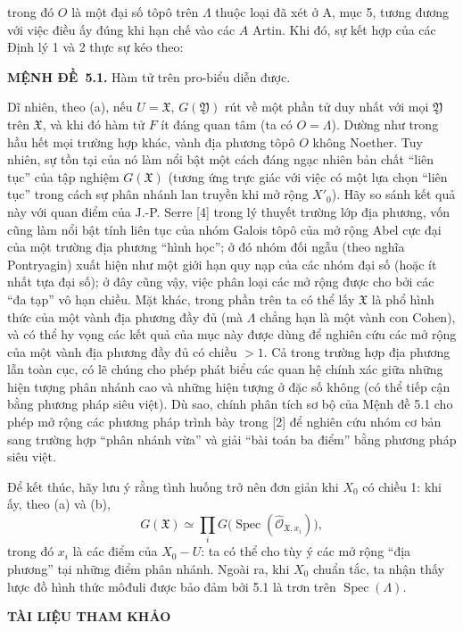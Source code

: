 \documentclass[11pt,twoside,openany]{book}
\numberwithin{equation}{section}
\newcommand{\src}[1]{%
  \phantomsection\hypertarget{src:\fgasourceid:#1}{}%
  \marginpar{\raggedleft\footnotesize\sffamily #1}%
}
\newcommand{\fgasourceid}{unset}
\newcommand{\result}[2]{\par\medskip\noindent\textbf{#1\if\relax\detokenize{#2}\relax\else\ #2\fi.}\quad}
\begin{document}
\src{389}
trong đó $O$ là một đại số tôpô trên $\Lambda$ thuộc loại đã xét ở A, mục 5,
tương đương với việc điều ấy đúng khi hạn chế vào các $A$ Artin. Khi đó, sự kết
hợp của các Định lý 1 và 2 thực sự kéo theo:

\result{MỆNH ĐỀ}{5.1} Hàm tử trên pro-biểu diễn được.

Dĩ nhiên, theo (a), nếu $U=\mathfrak X$, $G(\mathfrak Y)$ rút về một phần tử
duy nhất với mọi $\mathfrak Y$ trên $\mathfrak X$, và khi đó hàm tử $F$ ít
đáng quan tâm (ta có $O=\Lambda$). Dường như trong hầu hết mọi trường hợp khác,
vành địa phương tôpô $O$ không Noether. Tuy nhiên, sự tồn tại của nó làm nổi
bật một cách đáng ngạc nhiên bản chất ``liên tục'' của tập nghiệm
$G(\mathfrak X)$ (tương ứng trực giác với việc có một lựa chọn ``liên tục''
trong cách sự phân nhánh lan truyền khi mở rộng $X'_0$). Hãy so sánh kết quả
này với quan điểm của J.-P. Serre [4] trong lý thuyết trường lớp địa phương,
vốn cũng làm nổi bật tính liên tục của nhóm Galois tôpô của mở rộng Abel cực
đại của một trường địa phương ``hình học''; ở đó nhóm đối ngẫu (theo nghĩa
Pontryagin) xuất hiện như một giới hạn quy nạp của các nhóm đại số (hoặc ít
nhất tựa đại số); ở đây cũng vậy, việc phân loại các mở rộng được cho bởi các
``đa tạp'' vô hạn chiều. Mặt khác, trong phần trên ta có thể lấy
$\mathfrak X$ là phổ hình thức của một vành địa phương đầy đủ (mà $\Lambda$
chẳng hạn là một vành con Cohen), và có thể hy vọng các kết quả của mục này
được dùng để nghiên cứu các mở rộng của một vành địa phương đầy đủ có chiều
$>1$. Cả trong trường hợp địa phương lẫn toàn cục, có lẽ chúng cho phép phát
biểu các quan hệ chính xác giữa những hiện tượng phân nhánh cao và những hiện
tượng ở đặc số không (có thể tiếp cận bằng phương pháp siêu việt). Dù sao,
chính phân tích sơ bộ của Mệnh đề 5.1 cho phép mở rộng các phương pháp trình
bày trong [2] để nghiên cứu nhóm cơ bản sang trường hợp ``phân nhánh vừa'' và
giải ``bài toán ba điểm'' bằng phương pháp siêu việt.

Để kết thúc, hãy lưu ý rằng tình huống trở nên đơn giản khi $X_0$ có chiều 1:
khi ấy, theo (a) và (b),
\[
  G(\mathfrak X)\simeq
  \prod_iG\bigl(\operatorname{Spec}(\widehat{\mathcal O}_{\mathfrak X,x_i})\bigr),
\]
trong đó $x_i$ là các điểm của $X_0-U$: ta có thể cho tùy ý các mở rộng ``địa
phương'' tại những điểm phân nhánh. Ngoài ra, khi $X_0$ chuẩn tắc, ta nhận thấy
lược đồ hình thức môđuli được bảo đảm bởi 5.1 là trơn trên
$\operatorname{Spec}(\Lambda)$.

\src{390}
\begin{center}
  \textbf{TÀI LIỆU THAM KHẢO}
\end{center}
\end{document}
